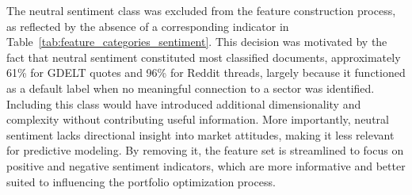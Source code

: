 The neutral sentiment class was excluded from the feature construction process, as reflected by the absence of a corresponding indicator in Table~\ref{tab:feature_categories_sentiment}. This decision was motivated by the fact that neutral sentiment constituted most classified documents, approximately 61\% for GDELT quotes and 96\% for Reddit threads, largely because it functioned as a default label when no meaningful connection to a sector was identified. Including this class would have introduced additional dimensionality and complexity without contributing useful information. More importantly, neutral sentiment lacks directional insight into market attitudes, making it less relevant for predictive modeling. By removing it, the feature set is streamlined to focus on positive and negative sentiment indicators, which are more informative and better suited to influencing the portfolio optimization process.